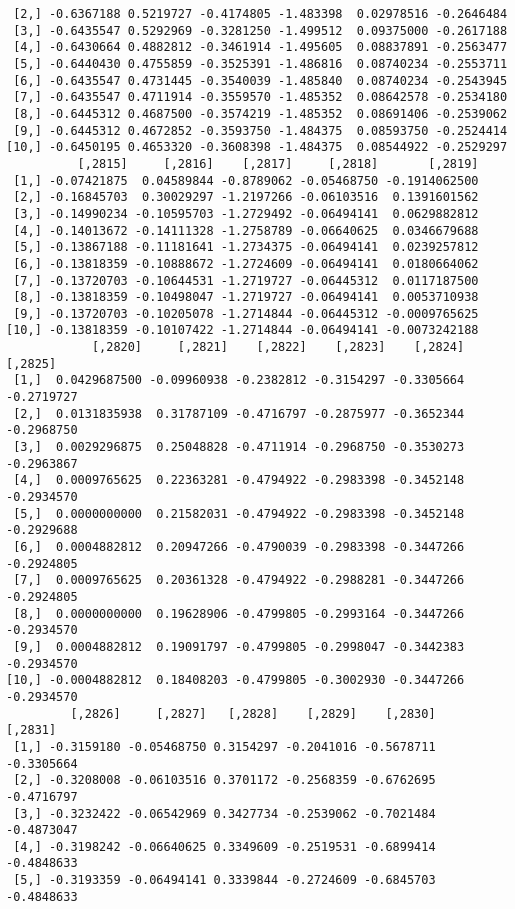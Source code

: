 \documentclass[
  letterpaper,
  DIV=11,
  numbers=noendperiod]{scrreprt}
\begin{document}
\begin{verbatim}
 [2,] -0.6367188 0.5219727 -0.4174805 -1.483398  0.02978516 -0.2646484
 [3,] -0.6435547 0.5292969 -0.3281250 -1.499512  0.09375000 -0.2617188
 [4,] -0.6430664 0.4882812 -0.3461914 -1.495605  0.08837891 -0.2563477
 [5,] -0.6440430 0.4755859 -0.3525391 -1.486816  0.08740234 -0.2553711
 [6,] -0.6435547 0.4731445 -0.3540039 -1.485840  0.08740234 -0.2543945
 [7,] -0.6435547 0.4711914 -0.3559570 -1.485352  0.08642578 -0.2534180
 [8,] -0.6445312 0.4687500 -0.3574219 -1.485352  0.08691406 -0.2539062
 [9,] -0.6445312 0.4672852 -0.3593750 -1.484375  0.08593750 -0.2524414
[10,] -0.6450195 0.4653320 -0.3608398 -1.484375  0.08544922 -0.2529297
          [,2815]     [,2816]    [,2817]     [,2818]       [,2819]
 [1,] -0.07421875  0.04589844 -0.8789062 -0.05468750 -0.1914062500
 [2,] -0.16845703  0.30029297 -1.2197266 -0.06103516  0.1391601562
 [3,] -0.14990234 -0.10595703 -1.2729492 -0.06494141  0.0629882812
 [4,] -0.14013672 -0.14111328 -1.2758789 -0.06640625  0.0346679688
 [5,] -0.13867188 -0.11181641 -1.2734375 -0.06494141  0.0239257812
 [6,] -0.13818359 -0.10888672 -1.2724609 -0.06494141  0.0180664062
 [7,] -0.13720703 -0.10644531 -1.2719727 -0.06445312  0.0117187500
 [8,] -0.13818359 -0.10498047 -1.2719727 -0.06494141  0.0053710938
 [9,] -0.13720703 -0.10205078 -1.2714844 -0.06445312 -0.0009765625
[10,] -0.13818359 -0.10107422 -1.2714844 -0.06494141 -0.0073242188
            [,2820]     [,2821]    [,2822]    [,2823]    [,2824]    [,2825]
 [1,]  0.0429687500 -0.09960938 -0.2382812 -0.3154297 -0.3305664 -0.2719727
 [2,]  0.0131835938  0.31787109 -0.4716797 -0.2875977 -0.3652344 -0.2968750
 [3,]  0.0029296875  0.25048828 -0.4711914 -0.2968750 -0.3530273 -0.2963867
 [4,]  0.0009765625  0.22363281 -0.4794922 -0.2983398 -0.3452148 -0.2934570
 [5,]  0.0000000000  0.21582031 -0.4794922 -0.2983398 -0.3452148 -0.2929688
 [6,]  0.0004882812  0.20947266 -0.4790039 -0.2983398 -0.3447266 -0.2924805
 [7,]  0.0009765625  0.20361328 -0.4794922 -0.2988281 -0.3447266 -0.2924805
 [8,]  0.0000000000  0.19628906 -0.4799805 -0.2993164 -0.3447266 -0.2934570
 [9,]  0.0004882812  0.19091797 -0.4799805 -0.2998047 -0.3442383 -0.2934570
[10,] -0.0004882812  0.18408203 -0.4799805 -0.3002930 -0.3447266 -0.2934570
         [,2826]     [,2827]   [,2828]    [,2829]    [,2830]    [,2831]
 [1,] -0.3159180 -0.05468750 0.3154297 -0.2041016 -0.5678711 -0.3305664
 [2,] -0.3208008 -0.06103516 0.3701172 -0.2568359 -0.6762695 -0.4716797
 [3,] -0.3232422 -0.06542969 0.3427734 -0.2539062 -0.7021484 -0.4873047
 [4,] -0.3198242 -0.06640625 0.3349609 -0.2519531 -0.6899414 -0.4848633
 [5,] -0.3193359 -0.06494141 0.3339844 -0.2724609 -0.6845703 -0.4848633

\end{verbatim}
\end{document}
